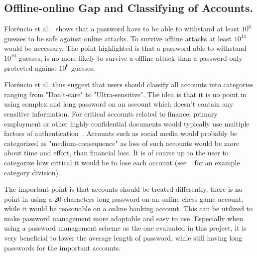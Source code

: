 \subsection{Offline-online Gap and Classifying of Accounts.}\label{classification} Florêncio et al.~\cite{guide-pws} shows that a password have to be able to withstand at least $10^6$ guesses to be safe against online attacks. To survive offline attacks at least $10^{14}$ would be necessary. The point highlighted is that a password able to withstand $10^{10}$ guesses, is no more likely to survive a offline attack than a password only protected against $10^6$ guesses. 
\par Florêncio et al. thus suggest that users should classify all accounts into categories ranging from "Don't-care" to "Ultra-sensitive". The idea is that it is no point in using complex and long password on an account which doesn't contain any sensitive information. For critical accounts related to finance, primary employment or other highly confidential documents would typically use multiple factors of authentication~\cite{2-factor-auth}. Accounts such as social media would probably be categorized as "medium-consequence" as loss of such accounts would be more about time and effort, than financial loss. It is of course up to the user to categorize how critical it would be to lose each account (see ~\cite{guide-pws} for an example category division). 
\par The important point is that accounts should be treated differently, there is no point in using a 20 characters long password on an online chess game account, while it would be reasonable on a online banking account. This can be utilized to make password management more adaptable and easy to use. Especially when using a password management scheme as the one evaluated in this project, it is very beneficial to lower the average length of password, while still having long passwords for the important accounts.



